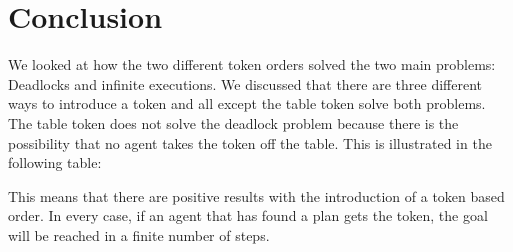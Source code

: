 \chapter{Conclusion}\label{chap:conclusion}

We looked at how the two different token orders solved the two main problems: Deadlocks and infinite executions. We discussed that there are three different ways to introduce a token and all except the table token solve both problems. The table token does not solve the deadlock problem because there is the possibility that no agent takes the token off the table. This is illustrated in the following table:

\begin{table}[h!]
\centering
{}
\end{table}

This means that there are positive results with the introduction of a token based order. In every case, if an agent that has found a plan gets the token, the goal will be reached in a finite number of steps.

